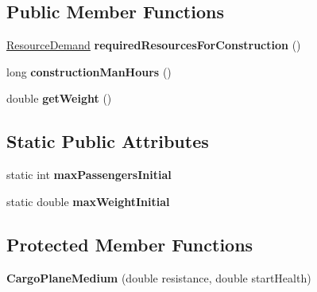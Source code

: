 \subsection*{Public Member Functions}
\begin{DoxyCompactItemize}
\item 
\hyperlink{classuniverse_1_1_resource_demand}{Resource\+Demand} {\bfseries required\+Resources\+For\+Construction} ()\hypertarget{classtools_1_1vehicles_1_1air_1_1_cargo_plane_medium_ab288057221c401bc277968e5deaf849a}{}\label{classtools_1_1vehicles_1_1air_1_1_cargo_plane_medium_ab288057221c401bc277968e5deaf849a}

\item 
long {\bfseries construction\+Man\+Hours} ()\hypertarget{classtools_1_1vehicles_1_1air_1_1_cargo_plane_medium_a0b1dadd02a58000be1748fdd01d94d76}{}\label{classtools_1_1vehicles_1_1air_1_1_cargo_plane_medium_a0b1dadd02a58000be1748fdd01d94d76}

\item 
double {\bfseries get\+Weight} ()\hypertarget{classtools_1_1vehicles_1_1air_1_1_cargo_plane_medium_a6d361b6880983054d048022a4a91bd33}{}\label{classtools_1_1vehicles_1_1air_1_1_cargo_plane_medium_a6d361b6880983054d048022a4a91bd33}

\end{DoxyCompactItemize}
\subsection*{Static Public Attributes}
\begin{DoxyCompactItemize}
\item 
static int {\bfseries max\+Passengers\+Initial}\hypertarget{classtools_1_1vehicles_1_1air_1_1_cargo_plane_medium_a353d76646d75c26ff5fd44e481624a78}{}\label{classtools_1_1vehicles_1_1air_1_1_cargo_plane_medium_a353d76646d75c26ff5fd44e481624a78}

\item 
static double {\bfseries max\+Weight\+Initial}\hypertarget{classtools_1_1vehicles_1_1air_1_1_cargo_plane_medium_a99f0a26682fe11ffde446b4220311595}{}\label{classtools_1_1vehicles_1_1air_1_1_cargo_plane_medium_a99f0a26682fe11ffde446b4220311595}

\end{DoxyCompactItemize}
\subsection*{Protected Member Functions}
\begin{DoxyCompactItemize}
\item 
{\bfseries Cargo\+Plane\+Medium} (double resistance, double start\+Health)\hypertarget{classtools_1_1vehicles_1_1air_1_1_cargo_plane_medium_acbf551d5e57b4ccb4f18dedcf0900165}{}\label{classtools_1_1vehicles_1_1air_1_1_cargo_plane_medium_acbf551d5e57b4ccb4f18dedcf0900165}

\end{DoxyCompactItemize}
